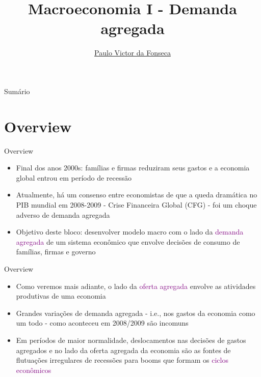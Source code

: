 \documentclass[10pt]{beamer}
\title[]{Macroeconomia I - Demanda agregada}
\author[]{\href{https://pvfonseca.github.io}{Paulo Victor da Fonseca}}
\date{}
\begin{document}
\begin{frame}[plain]
\end{frame}

\begin{frame}{Sumário}
    \tableofcontents
\end{frame}

\section{Overview}
\begin{frame}{Overview}
    \begin{itemize}
        \item Final dos anos 2000s: famílias e firmas reduziram seus gastos e a economia global entrou em período de recessão\bigskip
         
        \item Atualmente, há um consenso entre economistas de que a queda dramática no PIB mundial em 2008-2009 - Crise Financeira Global (CFG) - foi um choque adverso de demanda agregada\bigskip
         
        \item Objetivo deste bloco: desenvolver modelo macro com o lado da \textcolor{purple}{demanda agregada} de um sistema econômico que envolve decisões de consumo de famílias, firmas e governo
    \end{itemize}
\end{frame}

\begin{frame}{Overview}
    \begin{itemize}
        \item Como veremos mais adiante, o lado da \textcolor{purple}{oferta agregada} envolve as atividades produtivas de uma economia\bigskip
         
        \item Grandes variações de demanda agregada - i.e., nos gastos da economia como um todo - como aconteceu em 2008/2009 são incomuns\bigskip
         
        \item Em períodos de maior normalidade, deslocamentos nas decisões de gastos agregados e no lado da oferta agregada da economia são as fontes de flutuações irregulares de recessões para booms que formam os \textcolor{purple}{ciclos econômicos}
    \end{itemize}
\end{frame}
\end{document}
